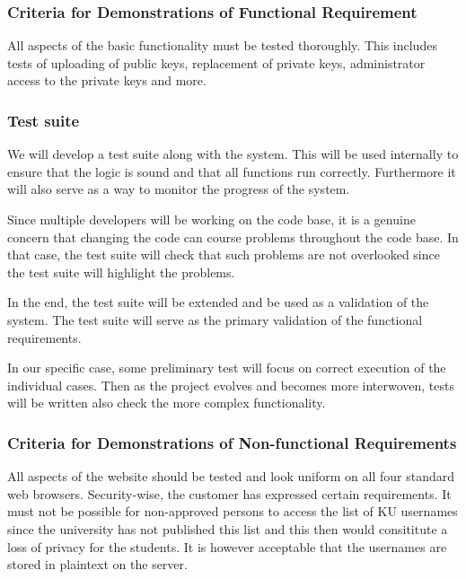 \documentclass[11pt,a4paper]{report}
\begin{document}
\subsubsection{Criteria for Demonstrations of Functional Requirement}
All aspects of the basic functionality must be tested thoroughly. This includes tests of uploading of public keys, replacement of private keys, administrator access to the private keys and more.

\subsubsection{Test suite}

We will develop a test suite along with the system. This will be used internally to ensure that the logic is sound and that all functions run correctly. Furthermore it will also serve as a way to monitor the progress of the system.

Since multiple developers will be working on the code base, it is a genuine concern that changing the code can course problems throughout the code base. In that case, the test suite will check that such problems are not overlooked since the test suite will highlight the problems.

In the end, the test suite will be extended and be used as a validation of the system. The test suite will serve as the primary validation of the functional requirements.

In our specific case, some preliminary test will focus on correct execution of the individual cases. Then as the project evolves and becomes more interwoven, tests will be written also check the more complex functionality.

\subsubsection{Criteria for Demonstrations of Non-functional Requirements}
All aspects of the website should be tested and look uniform on all four standard web browsers.
Security-wise, the customer has expressed certain requirements. It must not be possible for non-approved persons to access the list of KU usernames since the university has not published this list and this then would consititute a loss of privacy for the students. It is however acceptable that the usernames are stored in plaintext on the server.
\end{document}
